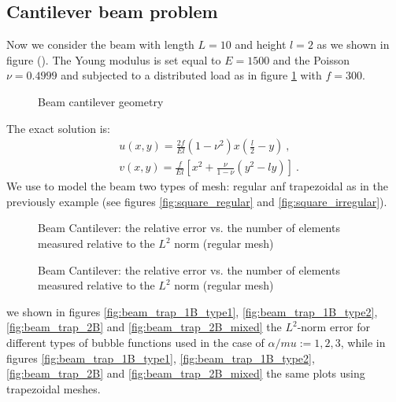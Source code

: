 \documentclass[preprint,12pt,authoryear]{elsarticle}
\begin{document}
\subsection{Cantilever beam problem}
Now we consider the beam with length $L=10$ and height $l=2$ as we shown in figure (). The Young modulus is set equal to $E=1500$ and the Poisson $\nu=0.4999$ and subjected to a distributed load as in figure \ref{fig:beam_geometry} with $f=300$.
%
\begin{figure}[h!]
\begin{center}

\caption{Beam cantilever geometry \label{fig:beam_geometry}}
\end{center}
\end{figure}
%
The exact solution is:
\begin{equation}
\begin{split}
&u(x,y) = \frac{2 f}{E l} (1-\nu^{2}) x \left( \frac{l}{2} - y \right)\: , \\
&v(x,y) = \frac{f}{E l} \left[ x^{2} + \frac{\nu}{1-\nu}\left(y^{2}-l y 
\right) \right] \: .
\end{split}
\end{equation}
We use to model the beam two types of mesh: regular anf trapezoidal as in the previously example (see figures \ref{fig:square_regular} and \ref{fig:square_irregular}).
%
\begin{figure}[h!]
\begin{center}
\caption{Beam Cantilever: the relative error vs. the number of elements measured relative to the $L^{2}$ norm (regular mesh)}
\end{center}
\end{figure}
%
\begin{figure}[h!]
\begin{center}
\caption{Beam Cantilever: the relative error vs. the number of elements measured relative to the $L^{2}$ norm (regular mesh)} 
\end{center}
\end{figure}
we shown in figures \ref{fig:beam_trap_1B_type1}, \ref{fig:beam_trap_1B_type2}, \ref{fig:beam_trap_2B} and \ref{fig:beam_trap_2B_mixed} the $L^{2}$-norm error for different types of bubble functions used in the case of $\alpha/mu:={1,2,3}$, while in figures \ref{fig:beam_trap_1B_type1}, \ref{fig:beam_trap_1B_type2}, \ref{fig:beam_trap_2B} and \ref{fig:beam_trap_2B_mixed} the same plots using trapezoidal meshes.
\end{document}

